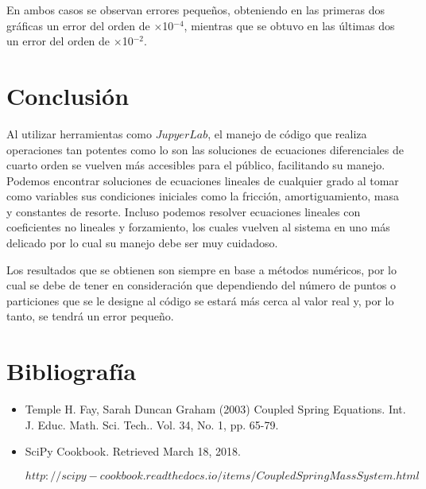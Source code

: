 \documentclass{article}
\begin{document}
En ambos casos se observan errores pequeños, obteniendo en las primeras dos gráficas un error del orden de $\times$10$^{-4}$, mientras que se obtuvo en las últimas dos un error del orden de $\times$10$^{-2}$. 

\section{Conclusión}
Al utilizar herramientas como $Jupyer Lab$, el manejo de código que realiza operaciones tan potentes como lo son las soluciones de ecuaciones diferenciales de cuarto orden se vuelven más accesibles para el público, facilitando su manejo. Podemos encontrar soluciones de ecuaciones lineales de cualquier grado al tomar como variables sus condiciones iniciales como la fricción, amortiguamiento, masa y constantes de resorte. Incluso podemos resolver ecuaciones lineales con coeficientes no lineales y forzamiento, los cuales vuelven al sistema en uno más delicado por lo cual su manejo debe ser muy cuidadoso.

Los resultados que se obtienen son siempre en base a métodos numéricos, por lo cual se debe de tener en consideración que dependiendo del número de puntos o particiones que se le designe al código se estará más cerca al valor real y, por lo tanto, se tendrá un error pequeño.  

\section{Bibliografía}
\begin{itemize}
\item Temple H. Fay, Sarah Duncan Graham (2003) Coupled Spring Equations. Int. J. Educ. Math. Sci. Tech.. Vol. 34, No. 1, pp. 65-79.

\item SciPy Cookbook. Retrieved March 18, 2018.

$http://scipy-cookbook.readthedocs.io/items/CoupledSpringMassSystem.html$
\end{itemize}
\end{document}
